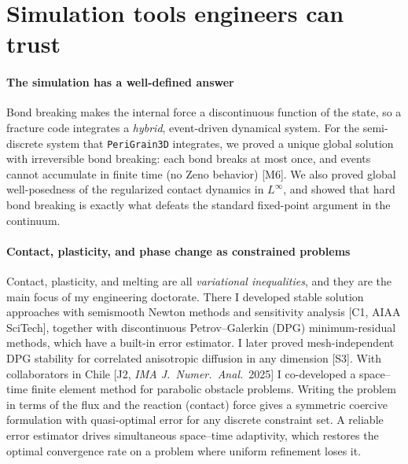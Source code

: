 \documentclass[11pt]{article}
\newcommand{\rc}[1]{\textcolor{accent}{[#1]}}
\begin{document}
\section{Simulation tools engineers can trust}

\paragraph{The simulation has a well-defined answer}
Bond breaking makes the internal force a discontinuous function of the state,
so a fracture code integrates a \emph{hybrid}, event-driven dynamical system.
For the semi-discrete system that \texttt{PeriGrain3D} integrates, we proved a
unique global solution with irreversible bond breaking: each bond breaks at
most once, and events cannot accumulate in finite time (no Zeno behavior)
\rc{M6}. We also proved global well-posedness of the regularized contact
dynamics in $L^\infty$, and showed that hard bond breaking is exactly what
defeats the standard fixed-point argument in the continuum. %

\paragraph{Contact, plasticity, and phase change as constrained problems}
Contact, plasticity, and melting are all \emph{variational inequalities}, and
they are the main focus of my engineering doctorate. There I developed stable
solution approaches with semismooth Newton methods and sensitivity analysis
\rc{C1, AIAA SciTech}, together with discontinuous Petrov--Galerkin (DPG)
minimum-residual methods, which have a built-in error estimator. I later proved
mesh-independent DPG stability for correlated anisotropic diffusion in any
dimension \rc{S3}. With collaborators in Chile
\rc{J2, \emph{IMA J.\ Numer.\ Anal.}\ 2025} I co-developed a space--time finite
element method for parabolic obstacle problems. Writing the problem in terms of
the flux and the reaction (contact) force gives a symmetric coercive
formulation with quasi-optimal error for any discrete constraint set. A
reliable error estimator drives simultaneous space--time adaptivity, which
restores the optimal convergence rate on a problem where uniform refinement
loses it.
\end{document}
